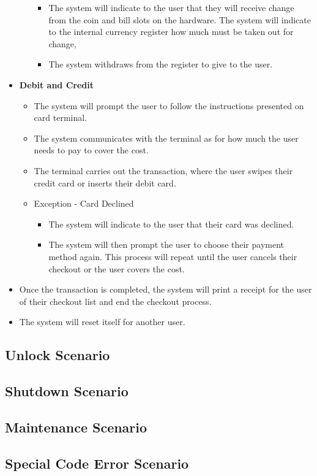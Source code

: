 \begin{itemize}
\begin{itemize}
\begin{itemize}
            \item The system will indicate to the user that they will receive 
            change from the coin and bill slots on the hardware. The system 
            will indicate to the internal currency register how much must be 
            taken out for change,
            \item The system withdraws from the register to give to the user.
        \end{itemize}
    \end{itemize}
    \item \textbf{Debit and Credit}
    \begin{itemize}
        \item The system will prompt the user to follow the instructions 
        presented on card terminal.
        \item The system communicates with the terminal as for how much the 
        user needs to pay to cover the cost.
        \item The terminal carries out the transaction, where the user swipes 
        their credit card or inserts their debit card.
        \item Exception - Card Declined
        \begin{itemize}
            \item The system will indicate to the user that their card 
            was declined.
            \item The system will then prompt the user to choose their payment 
            method again. This process will repeat until the user cancels 
            their checkout or the user covers the cost.
        \end{itemize}
    \end{itemize}
    \item Once the transaction is completed, the system will print a receipt 
    for the user of their checkout list and end the checkout process.
    \item The system will reset itself for another user.
\end{itemize}

\subsection{Unlock Scenario}
\subsection{Shutdown Scenario}
\subsection{Maintenance Scenario}
\subsection{Special Code Error Scenario}
